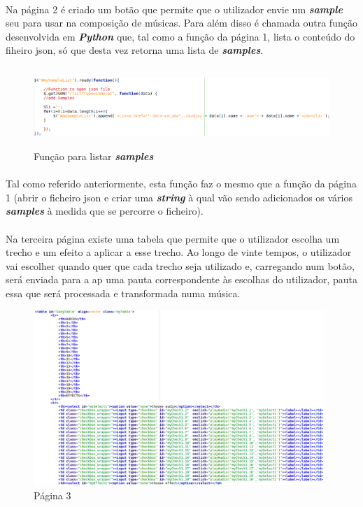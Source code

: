 \documentclass[a4paper]{report}
\begin{document}
\paragraph{}Na página 2 é criado um botão que permite que o utilizador envie um \textit{\textbf{sample}} seu para usar na composição de músicas. Para além disso é chamada outra função desenvolvida em \textit{\textbf{Python}} que, tal como a função da página 1, lista o conteúdo do fiheiro \ac{json}, só que desta vez retorna uma lista de \textit{\textbf{samples}}.

\begin{figure}[H]
\center
\includegraphics[height=3cm] {imagens/page2_function}
\caption{Função para listar \textit{\textbf{samples}}}
\end{figure}
\paragraph{}Tal como referido anteriormente, esta função faz o mesmo que a função da página 1 (abrir o ficheiro \ac{json} e criar uma \textit{\textbf{string}} à qual vão sendo adicionados os vários \textit{\textbf{samples}} à medida que se percorre o ficheiro).

\newpage

\paragraph{}Na terceira página existe uma tabela que permite que o utilizador escolha um trecho e um efeito a aplicar a esse trecho. Ao longo de vinte tempos, o utilizador vai escolher quando quer que cada trecho seja utilizado e, carregando num botão, será enviada para a \ac{ap} uma pauta correspondente às escolhas do utilizador, pauta essa que será processada e transformada numa música.

\begin{figure}[H]
\center
\includegraphics[width=11cm] {imagens/page3_1}
\caption{Página 3}
\end{figure}
\end{document}

